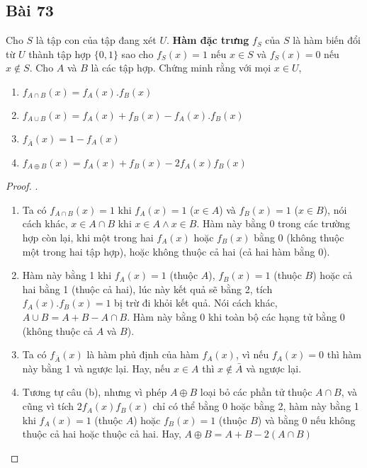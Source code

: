 \subsection*{Bài 73}
Cho $S$ là tập con của tập đang xét $U$. \textbf{Hàm đặc trưng} $f_S$ của $S$ là hàm biến đổi từ $U$ thành tập hợp $\{0,1\}$ sao cho $f_S(x)=1$ nếu $x\in S$ và $f_S(x)=0$ nếu $x\notin S$. Cho $A$ và $B$ là các tập hợp. Chứng minh rằng với mọi $x\in U$,
\begin{enumerate}[label=\alph*)]
    \item $f_{A\cap B}(x)=f_A(x).f_B(x)$
    \item $f_{A\cup B}(x)=f_A(x)+f_B(x)-f_A(x).f_B(x)$
    \item $f_{\bar A}(x)=1-f_A(x)$
    \item $f_{A\oplus B}(x)=f_A(x)+f_B(x)-2f_A(x)f_B(x)$
\end{enumerate}
\begin{proof}.
    \begin{enumerate}[label=\alph*)]
        \item Ta có $f_{A\cap B}(x)=1$ khi $f_A(x)=1$ ($x\in A$) và $f_B(x)=1$ ($x\in B$), nói cách khác, $x\in A\cap B$ khi $x\in A\land x\in B$. Hàm này bằng 0 trong các trường hợp còn lại, khi một trong hai $f_A(x)$ hoặc $f_B(x)$ bằng 0 (không thuộc một trong hai tập hợp), hoặc không thuộc cả hai (cả hai hàm bằng 0).
        \item Hàm này bằng 1 khi $f_A(x)=1$ (thuộc $A$), $f_B(x)=1$ (thuộc $B$) hoặc cả hai bằng 1 (thuộc cả hai), lúc này kết quả sẽ bằng 2, tích $f_A(x).f_B(x)=1$ bị trừ đi khỏi kết quả. Nói cách khác, $A\cup B=A+B-A\cap B$. Hàm này bằng 0 khi toàn bộ các hạng tử bằng 0 (không thuộc cả $A$ và $B$).
        \item Ta có $f_{\bar A}(x)$ là hàm phủ định của hàm $f_A(x)$, vì nếu $f_A(x)=0$ thì hàm này bằng 1 và ngược lại. Hay, nếu $x\in A$ thì $x\notin\bar A$ và ngược lại.
        \item Tương tự câu (b), nhưng vì phép $A\oplus B$ loại bỏ các phần tử thuộc $A\cap B$, và cũng vì tích $2f_A(x)f_B(x)$ chỉ có thể bằng 0 hoặc bằng 2, hàm này bằng 1 khi $f_A(x)=1$ (thuộc $A$) hoặc $f_B(x)=1$ (thuộc $B$) và bằng 0 nếu không thuộc cả hai hoặc thuộc cả hai. Hay, $A\oplus B=A+B-2(A\cap B)$
    \end{enumerate}
\end{proof}
